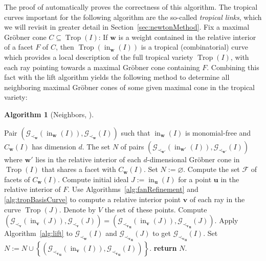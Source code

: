 \documentclass[
  paper=a4,
  titlepage,
  bibliography=totoc,
  pagesize=pdftex
]{scrartcl}
\numberwithin{figure}{section}
\numberwithin{equation}{section}
\numberwithin{table}{section}
\let\vec\mathbf
\DeclareMathOperator{\Trop}{Trop}
\DeclareMathOperator{\initial}{in}
\theoremstyle{definition}
\newtheorem{algo}[definition]{Algorithm}
\numberwithin{definition}{section}
\begin{document}
The proof of \cite[Proposition~3.2]{genericWalk} automatically proves the correctness of
this algorithm. The tropical curves important for the following algorithm are the
so-called \emph{tropical links}, which we will revisit in greater detail in
Section~\ref{sec:newtonMethod}. Fix a maximal Gröbner cone $C \subseteq \Trop(I)$: If
$\vec w$ is a weight contained in the relative interior of a facet $F$ of $C$, then
$\Trop(\initial_{\vec w}(I))$ is a tropical (combinatorial) curve which provides a local
description of the full tropical variety $\Trop(I)$, with each ray pointing towards a
maximal Gröbner cone containing $F$. Combining this fact with the lift algorithm yields
the following method to determine all neighboring maximal Gröbner cones of some given
maximal cone in the tropical variety:

\begin{algo}[Neighbors, {\cite[Algorithm~4.10]{compTropVar}}]\
  \label{alg:neighbors}
  \begin{algorithmic}[1]
    \Require Pair $(\mathcal G_{\prec_{\vec w}}(\initial_{\vec w}(I)), \mathcal
      G_{\prec_{\vec w}}(I))$ such that $\initial_{\vec w}(I)$ is monomial-free and
      $C_{\vec w}(I)$ has dimension $d$.
    \Ensure The set $N$ of pairs $(\mathcal G_{\prec_{\vec w'}}(\initial_{\vec w'}(I)),
      \mathcal G_{\prec_{\vec w'}}(I))$ where $\vec w'$ lies in the relative interior of
      each $d$-dimensional Gröbner cone in $\Trop(I)$ that shares a facet with $C_{\vec
      w}(I)$.
    \State Set $N := \varnothing$.
    \State Compute the set $\mathcal F$ of facets of $C_{\vec w}(I)$.
    \For{$F \in \mathcal F$}
      \State Compute initial ideal $J := \initial_{\vec u}(I)$ for a point $\vec u$ in the
        relative interior of $F$.
        \label{alg:neigh:line:start}
      \State Use Algorithms~\ref{alg:fanRefinement} and \ref{alg:tropBasisCurve} to compute
        a relative interior point $\vec v$ of each ray in the curve $\Trop(J)$. Denote by
        $V$ the set of these points.
        \label{alg:interiorPoints}
      \For{$\vec v \in V$}
        \State Compute $(\mathcal G_{\prec_{\vec v}}(\initial_{\vec v}(J)), \mathcal
          G_{\prec_{\vec v}}(J)) = (\mathcal G_{{\prec_{\vec v}}_{\vec u}}(\initial_{\vec
          v}(J)), \mathcal G_{{\prec_{\vec v}}_{\vec u}}(J))$.
        \State Apply Algorithm~\ref{alg:lift} to $\mathcal G_{\prec_{\vec w}}(I)$ and
          $\mathcal G_{{\prec_{\vec v}}_{\vec u}}(J)$ to get $\mathcal G_{{\prec_{\vec
          v}}_{\vec u}}(I)$.
        \State Set $N := N \cup \left\{ (\mathcal G_{{\prec_{\vec v}}_{\vec
          u}}(\initial_{\vec v}(I)), \mathcal G_{{\prec_{\vec v}}_{\vec u}}(I))
          \right\}$.
      \EndFor\label{alg:neigh:line:end}
    \EndFor
    \State\textbf{return} $N$.
  \end{algorithmic}
\end{algo}
\end{document}
